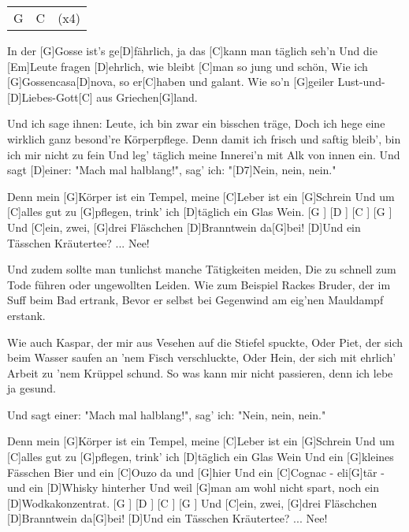 

\begin{guitar}
	 {\footnotesize\begin{tabular}{l|l|l}
			G & C & (x4)
	\end{tabular}}
	In der [G]Gosse ist's ge[D]fährlich, ja das [C]kann man täglich seh'n
	Und die [Em]Leute fragen [D]ehrlich, wie bleibt [C]man so jung und schön,
	Wie ich [G]Gossencasa[D]nova, so er[C]haben und galant.
	Wie so'n [G]geiler Lust-und-[D]Liebes-Gott[C] aus Griechen[G]land.
	
	Und ich sage ihnen: Leute, ich bin zwar ein bisschen träge,
	Doch ich hege eine wirklich ganz besond're Körperpflege.
	Denn damit ich frisch und saftig bleib', bin ich mir nicht zu fein
	Und leg' täglich meine Innerei'n mit Alk von innen ein.
	Und sagt [D]einer: "Mach mal halblang!", sag' ich: "[D7]Nein, nein, nein."
	
	Denn mein [G]Körper ist ein Tempel, meine [C]Leber ist ein [G]Schrein
	Und um [C]alles gut zu [G]pflegen, trink' ich [D]täglich ein Glas Wein.
	[G ] [D ] [C ] [G ] Und [C]ein, zwei, [G]drei Fläschchen [D]Branntwein da[G]bei!
	[D]Und ein Tässchen Kräutertee? ... Nee!
	
	Und zudem sollte man tunlichst manche Tätigkeiten meiden,
	Die zu schnell zum Tode führen oder ungewollten Leiden.
	Wie zum Beispiel Rackes Bruder, der im Suff beim Bad ertrank,
	Bevor er selbst bei Gegenwind am eig'nen Mauldampf erstank.
	
	Wie auch Kaspar, der mir aus Vesehen auf die Stiefel spuckte,
	Oder Piet, der sich beim Wasser saufen an 'nem Fisch verschluckte,
	Oder Hein, der sich mit ehrlich' Arbeit zu 'nem Krüppel schund.
	So was kann mir nicht passieren, denn ich lebe ja gesund.
	
	Und sagt einer: "Mach mal halblang!", sag' ich: "Nein, nein, nein."
	
	Denn mein [G]Körper ist ein Tempel, meine [C]Leber ist ein [G]Schrein
	Und um [C]alles gut zu [G]pflegen, trink' ich [D]täglich ein Glas Wein
	Und ein [G]kleines Fässchen Bier und ein [C]Ouzo da und [G]hier
	Und ein [C]Cognac - eli[G]tär - und ein [D]Whisky hinterher
	Und weil [G]man am wohl nicht spart, noch ein [D]Wodkakonzentrat.
	[G ] [D ] [C ] [G ] Und [C]ein, zwei, [G]drei Fläschchen [D]Branntwein da[G]bei!
	[D]Und ein Tässchen Kräutertee? ... Nee!
	

\end{guitar}
